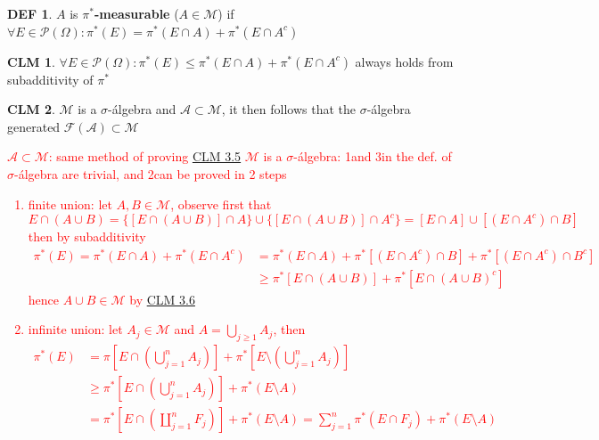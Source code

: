 \documentclass[hidelinks]{article}
\theoremstyle{definition}
\newtheorem*{defin}{DEF}
\theoremstyle{dotless}
\newtheorem{claim}{CLM}[section]
\theoremstyle{remark}
\begin{document}
\begin{defin}
$A$ is \textbf{$\pi^*$-measurable} ($A\in\mathscr{M}$) if $\forall E\in\mathscr{P}(\Omega):\pi^*(E)=\pi^*(E\cap A)+\pi^*(E\cap A^c)$
\end{defin}

\begin{claim}\label{CLM 3.6}
$\forall E\in\mathscr{P}(\Omega):\pi^*(E)\leq\pi^*(E\cap A)+\pi^*(E\cap A^c)$ always holds from subadditivity of $\pi^*$
\end{claim}

\begin{claim}
$\mathscr{M}$ is a $\sigma$-álgebra and $\mathscr{A}\subset\mathscr{M}$, it then follows that the $\sigma$-álgebra generated $\mathscr{F}(\mathscr{A})\subset\mathscr{M}$
\end{claim}
\textcolor{red}{$\mathscr{A}\subset\mathscr{M}$: same method of proving \hyperref[CLM 3.5]{CLM 3.5}\newline
$\mathscr{M}$ is a $\sigma$-álgebra: 1\degree and 3\degree in the def. of $\sigma$-álgebra are trivial, and 2\degree can be proved in 2 steps \begin{enumerate}[label=\arabic*\degree]
    \item finite union: let $A,B\in\mathscr{M}$, observe first that
    \[E\cap(A\cup B)=\{[E\cap(A\cup B)]\cap A\}\cup\{[E\cap(A\cup B)]\cap A^c\}=[E\cap A]\cup[(E\cap A^c)\cap B]\] then by subadditivity
    \begin{equation*}
    \begin{split}
        \pi^*(E)=\pi^*(E\cap A)+\pi^*(E\cap A^c)& =\pi^*(E\cap A)+\pi^*[(E\cap A^c)\cap B]+\pi^*[(E\cap A^c)\cap B^c] \\ & \geq\pi^*[E\cap(A\cup B)]+\pi^*[E\cap(A\cup B)^c]
    \end{split}
    \end{equation*}
    hence $A\cup B\in\mathscr{M}$ by \hyperref[CLM 3.6]{CLM 3.6}
    \item infinite union: let $A_j\in\mathscr{M}$ and $A=\bigcup_{j\geq1}A_j$, then
    \begin{equation*}
    \begin{split}
        \pi^*(E)&=\pi[E\cap(\bigcup_{j=1}^nA_j)]+\pi^*[E\setminus(\bigcup\limits_{j=1}^nA_j)]\\ &\geq\pi^*[E\cap(\bigcup_{j=1}^nA_j)]+\pi^*(E\setminus A)\\
        &=\pi^*[E\cap(\coprod_{j=1}^nF_j)]+\pi^*(E\setminus A)=\sum_{j=1}^n\pi^*(E\cap F_j)+\pi^*(E\setminus A)
    \end{split} 

\end{equation*}
\end{enumerate}}
\end{document}
